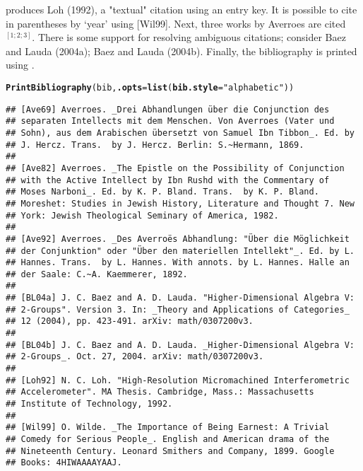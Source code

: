\documentclass[article]{jss}\usepackage[]{graphicx}\usepackage[]{color}
\makeatletter
\newcommand{\hlstr}[1]{\textcolor[rgb]{0.125,0.125,1}{#1}}%
\newcommand{\hlstd}[1]{\textcolor[rgb]{0.251,0.251,0.282}{#1}}%
\newcommand{\hlkwc}[1]{\textcolor[rgb]{0.529,0,0.184}{\textbf{#1}}}%
\newcommand{\hlkwd}[1]{\textcolor[rgb]{0.251,0.251,0.282}{\textbf{#1}}}%
\newenvironment{kframe}{%
 \def\at@end@of@kframe{}%
 \ifinner\ifhmode%
  \def\at@end@of@kframe{\end{minipage}}%
  \begin{minipage}{\columnwidth}%
 \fi\fi%
 \def\FrameCommand##1{\hskip\@totalleftmargin \hskip-\fboxsep
 \colorbox{shadecolor}{##1}\hskip-\fboxsep
     \hskip-\linewidth \hskip-\@totalleftmargin \hskip\columnwidth}%
 \MakeFramed {\advance\hsize-\width
   \@totalleftmargin\z@ \linewidth\hsize
   \@setminipage}}%
 {\par\unskip\endMakeFramed%
 \at@end@of@kframe}
\newenvironment{knitrout}{}{} %
\makeatother
\begin{document}
 produces Loh (1992), a "textual" citation using an entry key.  It is possible to cite in parentheses by `year' using  [Wil99].  Next, three works by Averroes are cited  $^{[1; 2; 3]}$.  There is some support for resolving ambiguous citations; consider  Baez and Lauda (2004a); Baez and Lauda (2004b).  Finally, the bibliography is printed using .
\begin{knitrout}
\color{fgcolor}\begin{kframe}
\begin{alltt}
\hlkwd{PrintBibliography}\hlstd{(bib,} \hlkwc{.opts} \hlstd{=} \hlkwd{list}\hlstd{(}\hlkwc{bib.style} \hlstd{=} \hlstr{"alphabetic"}\hlstd{))}
\end{alltt}
\begin{verbatim}
## [Ave69] Averroes. _Drei Abhandlungen über die Conjunction des
## separaten Intellects mit dem Menschen. Von Averroes (Vater und
## Sohn), aus dem Arabischen übersetzt von Samuel Ibn Tibbon_. Ed. by
## J. Hercz. Trans.  by J. Hercz. Berlin: S.~Hermann, 1869.
## 
## [Ave82] Averroes. _The Epistle on the Possibility of Conjunction
## with the Active Intellect by Ibn Rushd with the Commentary of
## Moses Narboni_. Ed. by K. P. Bland. Trans.  by K. P. Bland.
## Moreshet: Studies in Jewish History, Literature and Thought 7. New
## York: Jewish Theological Seminary of America, 1982.
## 
## [Ave92] Averroes. _Des Averroës Abhandlung: "Über die Möglichkeit
## der Conjunktion" oder "Über den materiellen Intellekt"_. Ed. by L.
## Hannes. Trans.  by L. Hannes. With annots. by L. Hannes. Halle an
## der Saale: C.~A. Kaemmerer, 1892.
## 
## [BL04a] J. C. Baez and A. D. Lauda. "Higher-Dimensional Algebra V:
## 2-Groups". Version 3. In: _Theory and Applications of Categories_
## 12 (2004), pp. 423-491. arXiv: math/0307200v3.
## 
## [BL04b] J. C. Baez and A. D. Lauda. _Higher-Dimensional Algebra V:
## 2-Groups_. Oct. 27, 2004. arXiv: math/0307200v3.
## 
## [Loh92] N. C. Loh. "High-Resolution Micromachined Interferometric
## Accelerometer". MA Thesis. Cambridge, Mass.: Massachusetts
## Institute of Technology, 1992.
## 
## [Wil99] O. Wilde. _The Importance of Being Earnest: A Trivial
## Comedy for Serious People_. English and American drama of the
## Nineteenth Century. Leonard Smithers and Company, 1899. Google
## Books: 4HIWAAAAYAAJ.
\end{verbatim}
\end{kframe}
\end{knitrout}
\end{document}
